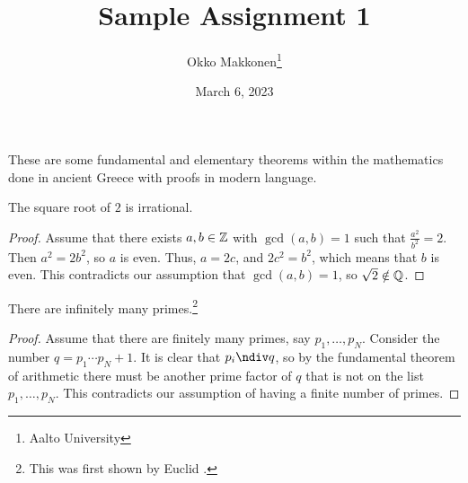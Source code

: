 \documentclass{myassignment}
\title{Sample Assignment 1}
\author{Okko Makkonen\thanks{Aalto University}}
\date{March 6, 2023}
\begin{document}
\maketitle

These are some fundamental and elementary theorems within the mathematics done in ancient Greece with proofs in modern language.
    

\begin{claim}
The square root of $2$ is irrational.
\end{claim}

\begin{proof}
Assume that there exists $a, b \in \mathbb{Z}$ with $\gcd(a, b) = 1$ such that $\frac{a^2}{b^2} = 2$. Then $a^2 = 2b^2$, so $a$ is even. Thus, $a = 2c$, and $2c^2 = b^2$, which means that $b$ is even. This contradicts our assumption that $\gcd(a, b) = 1$, so $\sqrt{2} \notin \mathbb{Q}$.
\end{proof}


\begin{claim}
There are infinitely many primes.\footnote{This was first shown by Euclid \cite{euclid400BCE}.}
\end{claim}

\begin{proof}
Assume that there are finitely many primes, say $p_1, \dots, p_N$. Consider the number $q = p_1 \cdots p_N + 1$. It is clear that $p_i \ndiv q$, so by the fundamental theorem of arithmetic there must be another prime factor of $q$ that is not on the list $p_1, \dots, p_N$. This contradicts our assumption of having a finite number of primes.
\end{proof}



\end{document}
